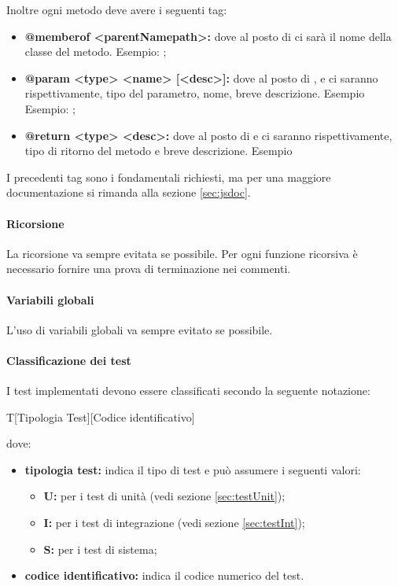            		Inoltre ogni metodo deve avere i seguenti tag:
           		\begin{itemize}
           			\item \textbf{@memberof <parentNamepath>:} dove al posto di  ci sarà il nome della classe del metodo. Esempio: ;
           			\item \textbf{@param <{type}> <name> [<desc>]:} dove al posto di ,  e  ci saranno rispettivamente, tipo del parametro, nome, breve descrizione. Esempio Esempio: ;
           			\item \textbf{@return <{type}> <desc>:} dove al posto di  e  ci saranno rispettivamente, tipo di ritorno del metodo e breve descrizione.
           			Esempio 
           		\end{itemize} 
           		I precedenti tag sono i fondamentali richiesti, ma per una maggiore documentazione si rimanda alla sezione \ref{sec:jsdoc}.
           		            	
                \paragraph{Ricorsione}
                La ricorsione va sempre evitata se possibile. Per ogni funzione ricorsiva è necessario fornire una prova di terminazione nei commenti.
                \paragraph{Variabili globali}
                L'uso di variabili globali va sempre evitato se possibile.
				\paragraph{Classificazione dei test}
				I test implementati devono essere classificati secondo la seguente notazione:
				\begin{center}
					T[Tipologia Test][Codice identificativo]
				\end{center}
				dove:
				\begin{itemize}
					\item \textbf{tipologia test:} indica il tipo di test e può assumere i seguenti valori:
					\begin{itemize}
						\item \textbf{U:} per i test di unità (vedi sezione \ref{sec:testUnit});
						\item \textbf{I:} per i test di integrazione (vedi sezione \ref{sec:testInt});
						\item \textbf{S:} per i test di sistema;
					\end{itemize}
					\item \textbf{codice identificativo:} indica il codice numerico del test.
				\end{itemize}
